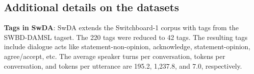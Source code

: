 \documentclass[letterpaper]{article} \usepackage{aaai20}  \usepackage{times}  \usepackage{helvet} \usepackage{courier}  \usepackage[hyphens]{url}  \usepackage{graphicx} \urlstyle{rm} \def\UrlFont{\rm}  \usepackage{graphicx}  \frenchspacing  \setlength{\pdfpagewidth}{8.5in}  \setlength{\pdfpageheight}{11in}
\begin{document}
\subsection{Additional details on the datasets}
\begin{table}[ht!]
\begin{center}
    \caption{Statistics for MRDA and SwDA.  is the number of Dialogue Act classes,  is the vocabulary size. Training, Validation and Testing indicate the number of conversations (number of utterances) in the respective splits.}
\end{center}
\end{table}
\textbf{Tags in SwDA}:
SwDA extends the Switchboard-1 corpus with tags from the SWBD-DAMSL tagset. The 220 tags were reduced to 42 tags. The resulting tags include dialogue acts like statement-non-opinion, acknowledge, statement-opinion, agree/accept, etc. The average speaker turns per conversation, tokens per conversation, and tokens per utterance are 195.2, 1,237.8, and 7.0, respectively.
\end{document}
